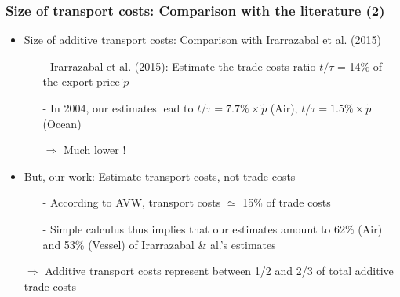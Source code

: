 \documentclass[10 pt,Helvetica, french]{beamer}
\begin{document}
\begin{frame}
\frametitle{Size of transport costs: Comparison with the literature (2)}
\begin{itemize}
\item Size of additive transport costs: Comparison with Irarrazabal et al. (2015) \vspace{0.1cm}
\begin{itemize}
\item[-] Irarrazabal et al. (2015): Estimate the trade costs ratio $t/\tau$ = 14\% of the export price $\widetilde{p}$ \vspace{0.1cm}
\item[-] In 2004, our estimates lead to $t/\tau = 7.7\% \times \widetilde{p}$ (Air), $t/\tau = 1.5\%\times \widetilde{p}$ (Ocean) \vspace{0.1cm}
\item[$\Rightarrow$] Much lower !
\end{itemize}
\item But, our work: Estimate transport costs, not trade costs \vspace{0.1cm}
\begin{itemize}
\item[-] According to AVW, transport costs $\simeq$ 15\% of trade costs \vspace{0.1cm}
\item[-] Simple calculus thus implies that our estimates amount to 62\% (Air) and 53\% (Vessel) of Irarrazabal \& al.'s estimates \vspace{0.1cm}
\end{itemize}
\item[$\Rightarrow$] Additive transport costs represent between 1/2 and 2/3 of total additive trade costs
\end{itemize}
\hyperlink{slide_result1}{}
\end{frame}
\end{document}
